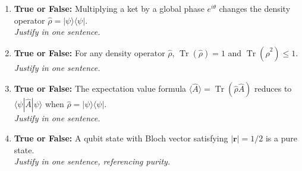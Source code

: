 \documentclass[11pt,a4paper]{article}
\begin{document}
\begin{tcolorbox}[ugconceptbox, title={Part II --- True / False + one-sentence justification \hfill\normalfont 4 $\times$ 2 pts = 8 pts}]

\begin{enumerate}[leftmargin=1.8em, label=\textbf{Q\arabic*.}, itemsep=10pt, start=5]

\item {}
  \textbf{True or False:} Multiplying a ket by a global phase $e^{i\theta}$
  changes the density operator $\hat{\rho}=|\psi\rangle\langle\psi|$.\\[3pt]
  \textit{Justify in one sentence.}

  \vspace{2cm}

\item {}
  \textbf{True or False:} For any density operator $\hat{\rho}$,
  $\operatorname{Tr}(\hat{\rho})=1$ and $\operatorname{Tr}(\hat{\rho}^2)\le 1$.\\[3pt]
  \textit{Justify in one sentence.}

  \vspace{2cm}

\item {}
  \textbf{True or False:} The expectation value formula
  $\langle\hat{A}\rangle=\operatorname{Tr}(\hat{\rho}\hat{A})$ reduces to
  $\langle\psi|\hat{A}|\psi\rangle$ when $\hat{\rho}=|\psi\rangle\langle\psi|$.\\[3pt]
  \textit{Justify in one sentence.}

  \vspace{2cm}

\item {}
  \textbf{True or False:} A qubit state with Bloch vector satisfying
  $|\mathbf{r}|=1/2$ is a pure state.\\[3pt]
  \textit{Justify in one sentence, referencing purity.}

  \vspace{2cm}

\end{enumerate}
\end{tcolorbox}
\end{document}
